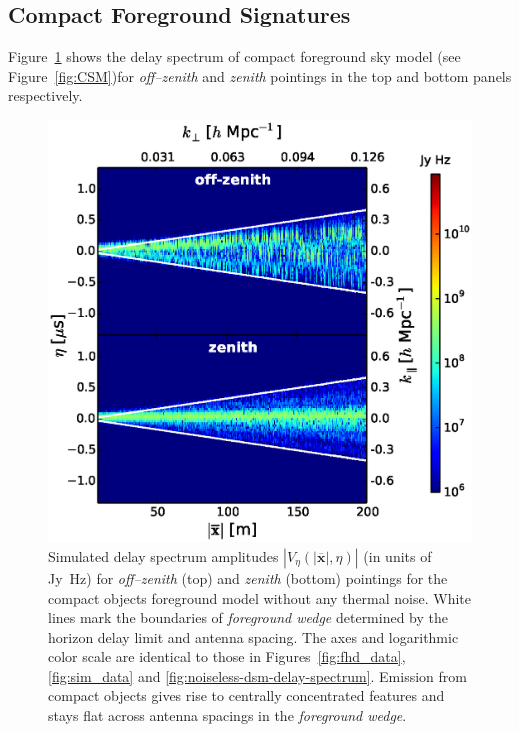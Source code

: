 \documentclass[preprint2,iop,numberedappendix]{emulateapj}
\begin{document}
\subsection{Compact Foreground Signatures}\label{sec:compact}

Figure~\ref{fig:noiseless-csm-delay-spectrum} shows the delay spectrum of compact foreground sky model (see Figure~\ref{fig:CSM})for {\it off--zenith} and {\it zenith} pointings in the top and bottom panels respectively. 

\begin{figure}[htb]
\centering
\includegraphics[width=\linewidth]{figures/v1_0/delta_array_multi_baseline_CLEAN_noiseless_visibilities_0.3m_ground_custom_gaussian_FG_model_csm_all_sky_nside_64_Tsys_95.0K_185.0_MHz_30.7_MHz_bhw2.0.eps}
\caption{Simulated delay spectrum amplitudes $|V_\eta(|\overline{\mathbf{x}}|,\eta)|$ (in units of Jy~Hz) for {\it off--zenith} (top) and {\it zenith} (bottom) pointings for the compact objects foreground model without any thermal noise. White lines mark the boundaries of {\it foreground wedge} determined by the horizon delay limit and antenna spacing. The axes and logarithmic color scale are identical to those in Figures~\ref{fig:fhd_data}, \ref{fig:sim_data} and \ref{fig:noiseless-dsm-delay-spectrum}. Emission from compact objects gives rise to centrally concentrated features and stays flat across antenna spacings in the {\it foreground wedge}.\label{fig:noiseless-csm-delay-spectrum}}
\end{figure}
\end{document}
